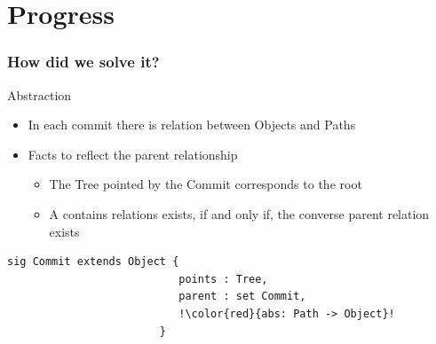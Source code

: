 \documentclass{beamer}
\begin{document}
\section{Progress}
\begin{frame}[fragile]
   \frametitle{How did we solve it?}
   \begin{block}{Abstraction}
      \begin{itemize}
         \item In each commit there is relation between Objects and Paths
         \item Facts to reflect the parent relationship
            \begin{itemize}
               \item The Tree pointed by the Commit corresponds to the root
               \item A contains relations exists, if and only if, the converse parent relation exists
            \end{itemize}
      \end{itemize}
   \end{block}
   \tiny
   \begin{lstlisting}[escapechar=!]
                        sig Commit extends Object {
                           points : Tree,
                           parent : set Commit,
                           !\color{red}{abs: Path -> Object}!
                        }
  \end{lstlisting}

\end{frame}

\end{document}
